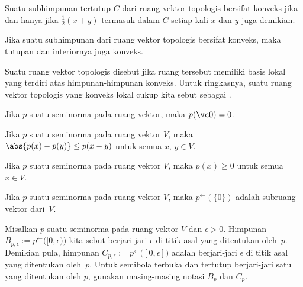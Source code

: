 \begin{prop} Suatu subhimpunan tertutup $C$ dari ruang vektor topologis bersifat konveks jika dan hanya jika $\frac12(x + y)$ termasuk dalam $C$ setiap kali $x$ dan $y$ juga demikian.
\end{prop}

\begin{prop} Jika suatu subhimpunan dari ruang vektor topologis bersifat konveks, maka tutupan dan interiornya juga konveks.
\end{prop}

\begin{defn} Suatu ruang vektor topologis disebut
 jika ruang tersebut memiliki basis lokal yang terdiri atas himpunan-himpunan konveks. Untuk ringkasnya, suatu ruang vektor topologis
yang konveks lokal cukup kita sebut sebagai
.
\end{defn}

\begin{prop} Jika $p$ suatu seminorma pada ruang vektor, maka $p(\vc 0) = 0$.
\end{prop}

\begin{prop} Jika $p$ suatu seminorma pada ruang vektor $V$, maka $\abs{p(x) - p(y)} \le p(x - y)$ untuk semua $x$, $y \in V$.
\end{prop}

\begin{cor} Jika $p$ suatu seminorma pada ruang vektor $V$, maka $p(x) \ge 0$ untuk semua $x \in V$.
\end{cor}

\begin{prop} Jika $p$ suatu seminorma pada ruang vektor $V$, maka $p^{\gets}(\{0\})$ adalah subruang vektor dari~$V$.
\end{prop}

\begin{defn} Misalkan $p$ suatu seminorma pada ruang vektor $V$ dan $\epsilon > 0$. Himpunan
$B_{p,\epsilon} := p^{\gets}\bigl([0,\epsilon)\bigr)$ kita sebut
 berjari-jari $\epsilon$ di titik asal yang ditentukan oleh~$p$. Demikian pula, himpunan
%
$C_{p,\epsilon} := p^{\gets}\bigl([0,\epsilon]\bigr)$ adalah
 berjari-jari $\epsilon$ di titik asal yang ditentukan oleh~$p$. Untuk semibola terbuka dan tertutup berjari-jari satu yang ditentukan
oleh $p$, gunakan masing-masing notasi $B_p$ dan $C_p$.
\end{defn}

